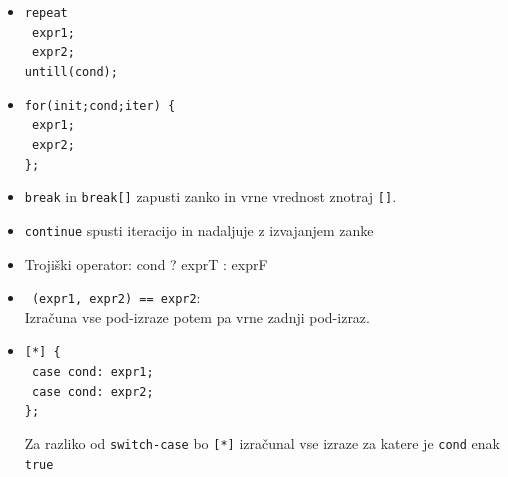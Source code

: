\documentclass[12pt]{report}
\newcommand{\wdot}{\textcolor{white}{.}}
\begin{document}
{\begin{spacing}{0}
\begin{itemize}
			\item \parbox{\textwidth}{\vspace{5px}\texttt{repeat \\\wdot\qquad expr1;\\ \wdot\qquad expr2;\\ untill(cond);}\vspace{5px}}
			\item \parbox{\textwidth}{\vspace{5px}\texttt{for(init;cond;iter) \{\\\wdot\qquad expr1;\\ \wdot\qquad expr2;\\\};}\vspace{5px}}
			\item \texttt{break} in \texttt{break[]} zapusti zanko in vrne vrednost znotraj \texttt{[]}.
			\item \texttt{continue} spusti iteracijo in nadaljuje z izvajanjem zanke
			\item Trojiški operator: cond ? exprT : exprF
			\item \texttt{~(expr1, expr2) == expr2}:\\
			Izračuna vse pod-izraze potem pa vrne zadnji pod-izraz.
			\item \parbox{\textwidth}{\vspace{5px}\texttt{[*] \{\\\wdot\qquad case cond: expr1;\\ \wdot\qquad case cond: expr2;\\\};}\vspace{5px}}
			Za razliko od \texttt{switch-case} bo \texttt{[*]} izračunal vse izraze za katere je \texttt{cond} enak \texttt{true}
		\end{itemize}
		\end{spacing}}
\end{document}
